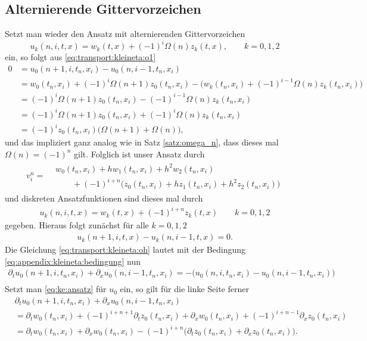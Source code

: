 \subsection*{Alternierende Gittervorzeichen}

Setzt man wieder den Ansatz mit alternierenden Gittervorzeichen
\[ u_k(n, i, t, x) = w_k(t, x) + (-1)^i \Omega(n) z_k(t, x), \qquad k = 0,1,2 \]
ein, so folgt aus \eqref{eq:transport:kleineta:o1}
\begin{align*}
0 &= u_0(n+1, i, t_n, x_i) - u_0(n, i-1, t_n, x_i)\\
&= w_0(t_n, x_i) + (-1)^i \Omega(n+1) z_0(t_n, x_i) - \bigl( w_k(t_n, x_i) + (-1)^{i-1} \Omega(n) z_k(t_n, x_i) \bigr)\\
&= (-1)^i \Omega(n+1) z_0(t_n, x_i) - (-1)^{i-1} \Omega(n) z_k(t_n, x_i)\\
&= (-1)^i \Omega(n+1) z_0(t_n, x_i) + (-1)^{i} \Omega(n) z_k(t_n, x_i)\\
&= (-1)^i z_0(t_n, x_i) \bigl( \Omega(n+1) + \Omega(n) \bigr),
\end{align*}
und das impliziert ganz analog wie in Satz \ref{satz:omega_n}, dass dieses mal $\Omega(n) = (-1)^n$ gilt.
Folglich ist unser Ansatz durch
\begin{align}
v^n_i = \begin{split}
&w_0(t_n, x_i) + h w_1(t_n, x_i) + h^2 w_2(t_n, x_i)\\
&\qquad + (-1)^{i+n} \bigl( z_0(t_n, x_i) + h z_1(t_n, x_i) + h^2 z_2(t_n, x_i) \bigr)
\end{split}
\end{align}
und diskreten Ansatzfunktionen sind dieses mal durch
\begin{align}\label{eq:ke:ansatz} u_k(n, i, t, x) = w_k(t,x) + (-1)^{i+n} z_k(t, x) \qquad k = 0,1,2 \end{align}
gegeben. Hieraus folgt zunächst für alle $k = 0,1,2$
\begin{align}\label{eq:appendix:kleineta:bedingung}
u_k(n+1, i, t, x) - u_k(n, i-1, t, x) = 0.
\end{align}
Die Gleichung \eqref{eq:transport:kleineta:oh} lautet mit der Bedingung \eqref{eq:appendix:kleineta:bedingung} nun
\begin{align*}
\partial_t u_0(n+1, i, t_n, x_i) + \partial_x u_0(n, i-1, t_n, x_i) = - \bigl( u_0(n, i, t_n, x_i) - u_0(n, i-1, t_n, x_i) \bigr)\\
\end{align*}
Setzt man \eqref{eq:ke:ansatz} für $u_0$ ein, so gilt für die linke Seite ferner
\begin{align}\label{eq:appendix:kleineta:oh:linkeseite}
&\partial_t u_0(n+1, i, t_n, x_i) + \partial_x u_0(n, i-1, t_n, x_i) \nonumber\\
&= \partial_t w_0(t_n,x_i) + (-1)^{i+n+1} \partial_t z_0(t_n,x_i)+ \partial_x w_0(t_n,x_i) + (-1)^{i+n-1} \partial_x z_0(t_n,x_i)\nonumber\\
&= \partial_t w_0(t_n,x_i) + \partial_x w_0(t_n,x_i) - (-1)^{i+n} \bigl( \partial_t z_0(t_n,x_i) + \partial_x z_0(t_n,x_i) \bigr).
\end{align}
